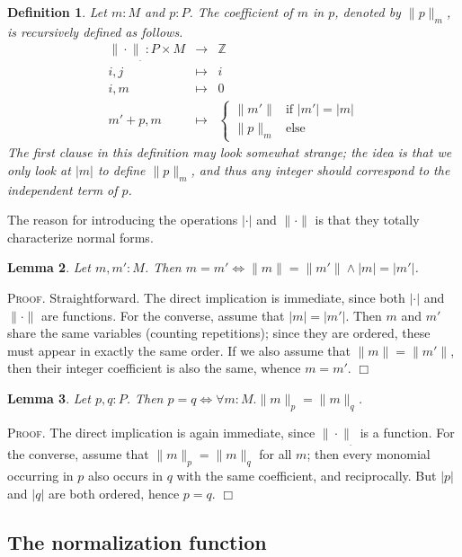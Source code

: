 \documentclass{article}
\newtheorem{definition}{Definition}[section]
\newtheorem{lemma}[definition]{Lemma}
\newenvironment{proof}{\smallskip\textsc{Proof.}}{\hspace*{\fill}$\Box$}
\newcommand{\Z}{{\mathbb Z}}
\newcommand{\coeff}[2]{\ensuremath{\|#2\|_{#1}}}
\begin{document}
\begin{definition}\label{defn:coeff}
Let $m:M$ and $p:P$.  The \emph{coefficient} of $m$ in $p$, denoted by
{\coeff mp}, is recursively defined as follows.
\begin{eqnarray*}
\coeff{\underline{\ }}\cdot : P\times M & \to & \Z\\
 i, j & \mapsto & i \\
 i, m & \mapsto & 0 \\
 m'+p, m & \mapsto & \left\{%
\begin{array}{lll}\|m'\| & \mbox{if $|m'|=|m|$} \\ 
 \coeff mp & \mbox{else}\end{array}\right.
\end{eqnarray*}
The first clause in this definition may look somewhat strange; the idea is
that we only look at $|m|$ to define {\coeff mp}, and thus any integer
should correspond to the independent term of $p$.
\end{definition}

The reason for introducing the operations $|\cdot|$ and $\|\cdot\|$ is
that they totally characterize normal forms.

\begin{lemma}\label{monchar}
Let $m,m':M$.  Then $m=m'\iff \|m\|=\|m'\| \wedge |m|=|m'|$.
\end{lemma}
\begin{proof}
Straightforward.  The direct implication is immediate, since both $|\cdot|$
and $\|\cdot\|$ are functions.  For the converse, assume that $|m|=|m'|$.
Then $m$ and $m'$ share the same variables (counting repetitions); since
they are ordered, these must appear in exactly the same order.  If we
also assume that $\|m\|=\|m'\|$, then their integer coefficient is also
the same, whence $m=m'$.
\end{proof}

\begin{lemma}\label{polchar}
Let $p,q:P$.  Then $p=q\iff \forall m:M.\coeff pm=\coeff qm$.
\end{lemma}
\begin{proof}
The direct implication is again immediate, since {\coeff{\underline{\ }}\cdot}
is a function.  For the converse, assume that $\coeff pm=\coeff qm$ for
all $m$; then every monomial occurring in $p$ also occurs in $q$ with the
same coefficient, and reciprocally.  But $|p|$ and $|q|$ are both ordered,
hence $p=q$.
\end{proof}

\subsection{The normalization function}\label{normfn}
\end{document}
